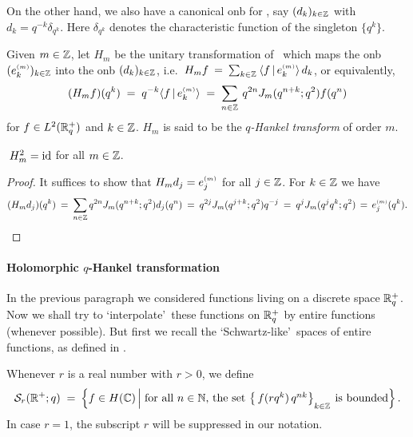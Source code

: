 On the other hand, we also have a canonical {\sc onb} for \Ltwoq,
say $(d_k)_{k\in \ZZ}$ with $d_k = q^{-k} \delta_{q^k}$. Here $\delta_{q^k}$
denotes the characteristic function of the singleton $\{q^k\}$.

\begin{defn} \label{def:qHankeltransform:unitary}
Given $m\in\ZZ$, let $H_m$ be the unitary transformation of \Ltwoq\
which maps the {\sc onb} $(\basis{m}{k})_{k\in \ZZ}$
into the {\sc onb} $(d_k)_{k\in \ZZ}$, i.e.\
$ H_m f \:=\:\sum_{k\in \ZZ} \:\scal{f}{\basis{m}{k}}\,d_k $,
or equivalently,
\begin{equation}\label{eq:qHankeltransform:def}
  (H_m f)(q^k) \;=\; q^{-k} \scal{f}{\basis{m}{k}}
          \;=\;\sum_{n\in \ZZ} \: q^{2n} \J{m}{q^{n+k}} f(q^n)
\end{equation}
for $f\in \Ltwoq$ and $k\in\ZZ$.
$H_m$ is said to be the {\em $q$-Hankel transform\/} of order $m$.
\end{defn}

\begin{prop} \label{prop:qHankelSquare_is_id}
$\: H_m^2 = \id$ for all $m\in\ZZ$.
\end{prop}
\begin{proof}
It suffices to show that $H_m d_j = \basis{m}{j}$ for all $j\in \ZZ$.
For $k \in \ZZ$ we have
$$ (H_m d_j)(q^k)  \:=\: \sum_{n\in \ZZ} q^{2n} \J{m}{q^{n+k}} d_j(q^n)
     \:=\:  q^{2j} \J{m}{q^{j+k}} q^{-j} \:=\:  q^j \J{m}{q^j q^k}
     \,=\,  \basis{m}{j}(q^k).  $$
\end{proof}


\paragraph{Holomorphic $q$-Hankel transformation}
In the previous paragraph we considered functions living on a
discrete space $\RR_q^+$. Now we shall try
to \lq interpolate\rq\ these functions on $\RR_q^+$ by entire
functions (whenever possible). But first we recall the \lq Schwartz-like\rq\ spaces
of entire functions, as defined in \cite[example 3.4.1.2]{Jeroen:QE2:haar}.

\begin{defn} \label{ex:Schwartz-like_space}
Whenever $r$ is a real number with $r>0$, we define
$$ {\mathcal S}_r(\RR^+;q)
    \;=\: \left\{ f \in \HC \left|\vertL \right.
          \mbox{for all $n \in \NN$, the set
          $\left\{\,f(r q^k)\,q^{nk} \right\}_{_{\scriptstyle k \in \ZZ}}$
          is bounded} \right\}.$$
In case $r=1$, the subscript $r$ will be suppressed in our notation.
\end{defn}

